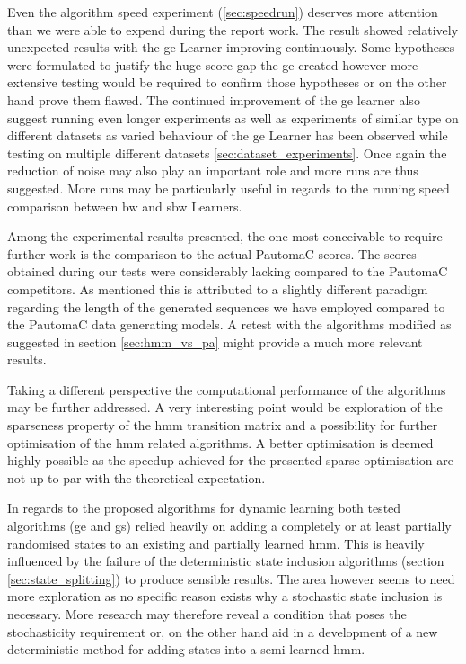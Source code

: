 Even the algorithm speed experiment (\ref{sec:speedrun}) deserves more attention than we were able to expend during the report work. The result showed relatively unexpected results with the \gls{ge} Learner improving continuously. Some hypotheses were formulated to justify the huge score gap the \gls{ge} created however more extensive testing would be required to confirm those hypotheses or on the other hand prove them flawed. The continued improvement of the \gls{ge} learner also suggest running even longer experiments as well as experiments of similar type on different datasets as varied behaviour of the \gls{ge} Learner has been observed while testing on multiple different datasets \ref{sec:dataset_experiments}. Once again the reduction of noise may also play an important role and more runs are thus suggested. More runs may be particularly useful in regards to the running speed comparison between \acrlong{bw} and \acrlong{sbw} Learners.

Among the experimental results presented, the one most conceivable to require further work is the comparison to the actual PautomaC scores. The scores obtained during our tests were considerably lacking compared to the PautomaC competitors. As mentioned this is attributed to a slightly different paradigm regarding the length of the generated sequences we have employed compared to the PautomaC data generating models. A retest with the algorithms modified as suggested in section \ref{sec:hmm_vs_pa} might provide a much more relevant results.

Taking a different perspective the computational performance of the algorithms may be further addressed. A very interesting point would be exploration of the sparseness property of the \gls{hmm} transition matrix and a possibility for further optimisation of the \gls{hmm} related algorithms. A better optimisation is deemed highly possible as the speedup achieved for the presented sparse optimisation are not up to par with the theoretical expectation.

In regards to the proposed algorithms for dynamic learning both tested algorithms (\acrlong{ge} and \acrlong{gs}) relied heavily on adding a completely or at least partially randomised states to an existing and partially learned \gls{hmm}. This is heavily influenced by the failure of the deterministic state inclusion algorithms (section \ref{sec:state_splitting}) to produce sensible results. The area however seems to need more exploration as no specific reason exists why a stochastic state inclusion is necessary. More research may therefore reveal a condition that poses the stochasticity requirement or, on the other hand aid in a development of a new deterministic method for adding states into a semi-learned \gls{hmm}.

